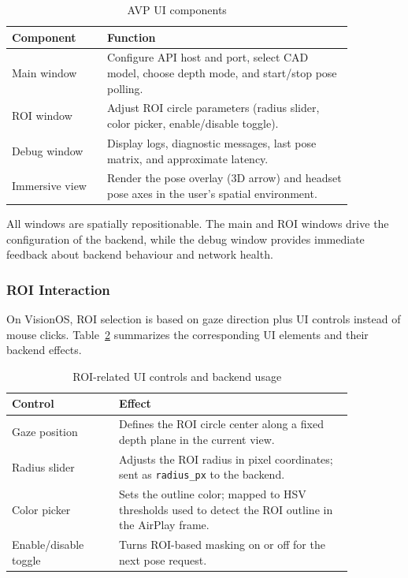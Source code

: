 \begin{table}[H]
    \centering
    \caption{AVP UI components}
    \label{tab:avp-windows}
    \begin{tabular}{p{0.24\linewidth}p{0.62\linewidth}}
        \toprule
        \textbf{Component} & \textbf{Function} \\
        \midrule
        Main window &
        Configure API host and port, select CAD model, choose depth mode, and start/stop pose polling. \\
        ROI window &
        Adjust ROI circle parameters (radius slider, color picker, enable/disable toggle). \\
        Debug window &
        Display logs, diagnostic messages, last pose matrix, and approximate latency. \\
        Immersive view &
        Render the pose overlay (3D arrow) and headset pose axes in the user’s spatial environment. \\
        \bottomrule
    \end{tabular}
\end{table}

All windows are spatially repositionable. The main and ROI windows drive the configuration of the backend, while the debug window provides immediate feedback about backend behaviour and network health.

\subsubsection{ROI Interaction}

On VisionOS, ROI selection is based on gaze direction plus UI controls instead of mouse clicks. Table~\ref{tab:roi-controls} summarizes the corresponding UI elements and their backend effects.

\begin{table}[H]
    \centering
    \caption{ROI-related UI controls and backend usage}
    \label{tab:roi-controls}
    \begin{tabular}{p{0.27\linewidth}p{0.59\linewidth}}
        \toprule
        \textbf{Control} & \textbf{Effect} \\
        \midrule
        Gaze position &
        Defines the ROI circle center along a fixed depth plane in the current view. \\
        Radius slider &
        Adjusts the ROI radius in pixel coordinates; sent as \texttt{radius\_px} to the backend. \\
        Color picker &
        Sets the outline color; mapped to HSV thresholds used to detect the ROI outline in the AirPlay frame. \\
        Enable/disable toggle &
        Turns ROI-based masking on or off for the next pose request. \\
        \bottomrule
    \end{tabular}
\end{table}


